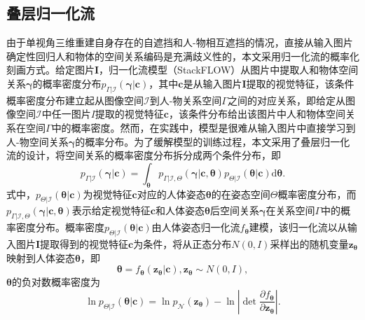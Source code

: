 \subsection{叠层归一化流}
由于单视角三维重建自身存在的自遮挡和人-物相互遮挡的情况，直接从输入图片确定性回归人和物体的空间关系编码是充满歧义性的，本文采用归一化流的概率化刻画方式。给定图片$\mathbf{I}$，归一化流模型（StackFLOW）从图片中提取人和物体空间关系$\mathbf{\gamma}$的概率密度分布$p_{\Gamma|\mathcal{I}}(\mathbf{\gamma}|\mathbf{c})$，其中$\mathbf{c}$是从输入图片$\mathbf{I}$提取的视觉特征，该条件概率密度分布建立起从图像空间$\mathcal{I}$到人-物关系空间$\mathcal{\Gamma}$之间的对应关系，即给定从图像空间$\mathcal{I}$中任一图片$I$提取的视觉特征$\mathbf{c}$，该条件分布给出该图片中人和物体空间关系在空间$\mathcal{\Gamma}$中的概率密度。然而，在实践中，模型是很难从输入图片中直接学习到人-物空间关系$\mathbf{\gamma}$的概率分布。为了缓解模型的训练过程，本文采用了叠层归一化流的设计，将空间关系的概率密度分布拆分成两个条件分布，即
\begin{equation}
	p_{\Gamma|\mathcal{I}}(\mathbf{\gamma}|\mathbf{c}) = \int_{\mathbf{\theta}} p_{\Gamma|\mathcal{I},\Theta}(\mathbf{\gamma}|\mathbf{c},\mathbf{\theta}) p_{\Theta|\mathcal{I}}(\mathbf{\theta}|\mathbf{c}) \text{d}\mathbf{\theta}.
\end{equation}
式中，$p_{\Theta|\mathcal{I}}(\mathbf{\theta}|\mathbf{c})$为视觉特征$\mathbf{c}$对应的人体姿态$\mathbf{\theta}$的在姿态空间$\mathcal{\Theta}$概率密度分布，而$p_{\Gamma|\mathcal{I},\Theta}(\mathbf{\gamma}|\mathbf{c},\mathbf{\theta})$表示给定视觉特征$\mathbf{c}$和人体姿态$\mathbf{\theta}$后空间关系$\mathbf{\gamma}$在关系空间$\mathcal{\Gamma}$中的概率密度分布。概率密度$p_{\Theta|\mathcal{I}}(\mathbf{\theta}|\mathbf{c})$由人体姿态归一化流$f_{\mathbf{\theta}}$建模，该归一化流以从输入图片$\mathbf{I}$提取得到的视觉特征$\mathbf{c}$为条件，将从正态分布$N(0,I)$采样出的随机变量$\mathbf{z}_{\mathbf{\theta}}$映射到人体姿态$\mathbf{\theta}$，即
\begin{equation}
	\mathbf{\theta} = f_{\mathbf{\theta}}(\mathbf{z}_{\mathbf{\theta}}|\mathbf{c}), \mathbf{z}_{\mathbf{\theta}} \sim N(0,I),
\end{equation}
$\mathbf{\theta}$的负对数概率密度为
\begin{equation} \label{eq:theta_log_prob}
	\ln p_{\Theta|\mathcal{I}}(\mathbf{\theta}|\mathbf{c}) = \ln p_{\mathcal{N}}(\mathbf{z}_{\mathbf{\theta}}) - \ln \left| \det \frac{\partial f_{\mathbf{\theta}}}{\partial \mathbf{z}_{\mathbf{\theta}}} \right|.
\end{equation}


